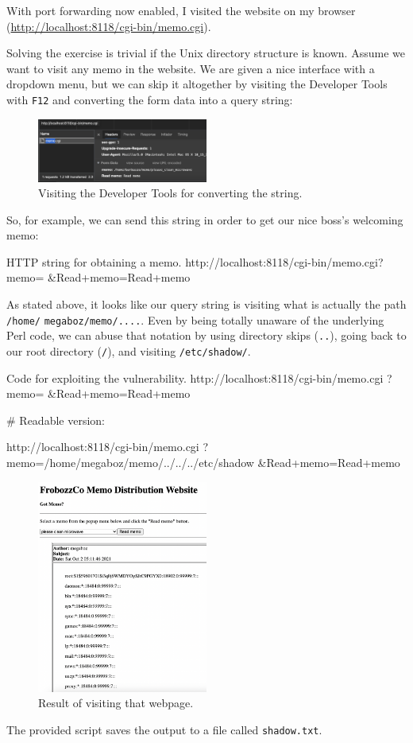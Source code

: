 \documentclass[a4paper,11pt,hidelinks]{article}
\begin{document}
With port forwarding now enabled, I visited the website on my browser (\url{http://localhost:8118/cgi-bin/memo.cgi}).

Solving the exercise is trivial if the Unix directory structure is known. Assume we want to visit any memo in the website. We are given a nice interface with a dropdown menu, but we can skip it altogether by visiting the Developer Tools with \verb=F12= and converting the form data into a query string:

\begin{figure}[h!]
  \centering
  \includegraphics[width=0.5\textwidth]{../drawable/devtools}
  \caption{Visiting the Developer Tools for converting the string.}
\end{figure}

So, for example, we can send this string in order to get our nice boss's welcoming memo:

\begin{code}{HTTP string for obtaining a memo.}
http://localhost:8118/cgi-bin/memo.cgi?memo=%
  &Read+memo=Read+memo
\end{code}

As stated above, it looks like our query string is visiting what is actually the path \verb=/home/= \verb=megaboz/memo/....=. Even by being totally unaware of the underlying Perl code, we can abuse that notation by using directory skips (\verb=..=), going back to our root directory (\verb=/=), and visiting \verb=/etc/shadow/=.

\begin{code}{Code for exploiting the vulnerability.}
http://localhost:8118/cgi-bin/memo.cgi
  ?memo=%
  &Read+memo=Read+memo

# Readable version:

http://localhost:8118/cgi-bin/memo.cgi
  ?memo=/home/megaboz/memo/../../../etc/shadow
  &Read+memo=Read+memo
\end{code}

\begin{figure}[h!]
  \centering
  \includegraphics[width=0.5\textwidth]{../drawable/result}
  \caption{Result of visiting that webpage.}
\end{figure}

The provided script saves the output to a file called \verb=shadow.txt=.

\endgroup
\end{document}
